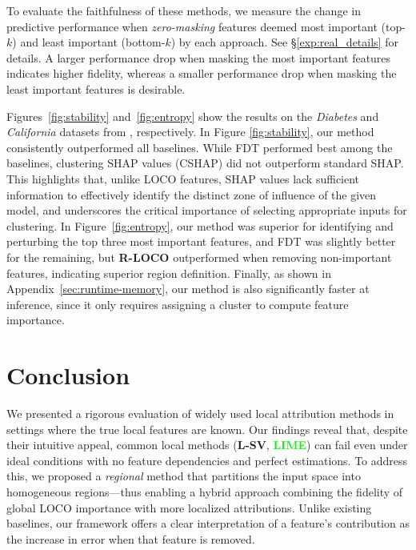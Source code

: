 \documentclass{article}
\theoremstyle{plain}
\theoremstyle{definition}
\theoremstyle{remark}
\newcommand{\ours}{\textcolor{ours}{\textbf{R-LOCO}}}
\newcommand{\lsv}{\textcolor{lsv}{\textbf{L-SV}}}
\newcommand{\lime}{\textcolor{lime}{\textbf{LIME}}}
\begin{document}
To evaluate the faithfulness of these methods, we measure the change in predictive performance when \emph{zero-masking} features deemed most important (top-$k$) and least important (bottom-$k$) by each approach. See \S\ref{exp:real_details} for details. A larger performance drop when masking the most important features indicates higher fidelity, whereas a smaller performance drop when masking the least important features is desirable.

Figures~\ref{fig:stability} and~\ref{fig:entropy} show the results on the \emph{Diabetes} and \emph{California} datasets from \cite{uci_dataset}, respectively. In Figure \ref{fig:stability}, our method consistently outperformed all baselines. While FDT performed best among the baselines, clustering SHAP values (CSHAP) did not outperform standard SHAP. This highlights that, unlike LOCO features, SHAP values lack sufficient information to effectively identify the distinct zone of influence of the given model, and underscores the critical importance of selecting appropriate inputs for clustering. In Figure~\ref{fig:entropy}, our method was superior for identifying and perturbing the top three most important features, and FDT was slightly better for the remaining, but \ours{} outperformed when removing non-important features, indicating superior region definition. Finally, as shown in Appendix~\ref{sec:runtime-memory}, our method is also significantly faster at inference, since it only requires assigning a cluster to compute feature importance.

\vspace{-0.2cm}
\section{Conclusion}
\vspace{-0.3cm}
We presented a rigorous evaluation of widely used local attribution methods in settings where the true local features are known. Our findings reveal that, despite their intuitive appeal, common local methods (\lsv{}, \lime{}) can fail even under ideal conditions with no feature dependencies and perfect estimations. To address this, we proposed a \emph{regional} method that partitions the input space into homogeneous regions—thus enabling a hybrid approach combining the fidelity of global LOCO importance with more localized attributions. Unlike existing baselines, our framework offers a clear interpretation of a feature’s contribution as the increase in error when that feature is removed.
\end{document}
